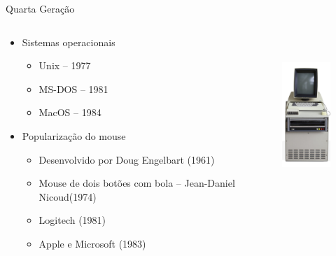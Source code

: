 \documentclass[aspectratio=169,
				xcolor=table]{beamer}
\begin{document}
	\begin{frame}[t]{Quarta Geração}
		\begin{columns}[t]
			\begin{column}{0.65\textwidth}
				\begin{itemize}
					\item Sistemas operacionais
					\begin{itemize}
						\item Unix – 1977
						\item MS-DOS – 1981
						\item MacOS – 1984
					\end{itemize}
					\vspace{0.5em}
					\item Popularização do mouse
					\begin{itemize}
						\item Desenvolvido por Doug Engelbart (1961)
						\item Mouse de dois botões com bola – Jean-Daniel Nicoud(1974)
						\item Logitech (1981)
						\item Apple e Microsoft (1983)
					\end{itemize}
				\end{itemize}
			\end{column}
			\begin{column}{0.35\textwidth}
				\vspace{-1.5em}
				\begin{figure}
					\centering
					\includegraphics[height=6cm, keepaspectratio]{../figs/cap03/geracao43} 			
				\end{figure}			
			\end{column}
		\end{columns}
	\end{frame}
\end{document}
